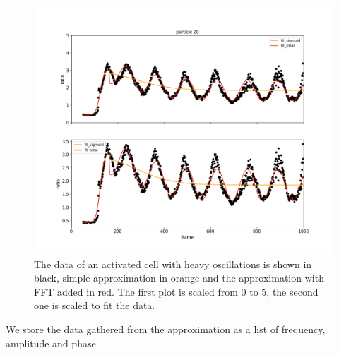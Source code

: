 \begin{figure}[h]
	\centering
	\includegraphics[width=\textwidth]{fig/particle_vis_fft_approx_pos}
	
	\caption{The data of an activated cell with heavy oscillations is shown in black, simple approximation in orange and the approximation with FFT added in red. The first plot is scaled from 0 to 5, the second one is scaled to fit the data.}
	\label{fig:particle_vis_fft_approx}
\end{figure}

We store the data gathered from the approximation as a list of frequency, amplitude and phase.
